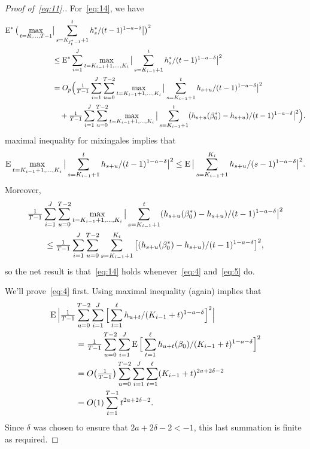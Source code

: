 \documentclass[12pt,fleqn]{article}
\begin{document}
\begin{proof}[Proof of~\eqref{eq:11}.]
For~\eqref{eq:14}, we have
\begin{align*}
  \operatorname{E}^* \big(\max_{t=R,\dots,T-1} &\big|\sum_{s=K_{j^*_t - 1}+1}^t h_s^*/(t-1)^{1-a-\delta} \big|\big)^2 \\
  &\leq \operatorname{E}^* \sum_{i=1}^{J} \max_{t = K_{i-1}+1,\dots,K_i} \big| \sum_{s=K_{i-1}+1}^t h_s^*/(t-1)^{1-a-\delta} \big|^2 \\
  &= O_p\Big(\tfrac{1}{T-1} \sum_{i=1}^{J} \sum_{u=0}^{T-2} \max_{t = K_{i-1}+1,\dots,K_i} \big| \sum_{s=K_{i-1}+1}^t h_{s+u} /(t-1)^{1-a-\delta} \big|^2 \\
  &\quad+ \tfrac{1}{T-1} \sum_{i=1}^{J} \sum_{u=0}^{T-2} \max_{t = K_{i-1}+1,\dots,K_i} \big| \sum_{s=K_{i-1}+1}^t (h_{s+u}(\beta_0^*) - h_{s+u}) /(t-1)^{1-a-\delta} \big|^2\Big).
\end{align*}
 maximal inequality for mixingales implies that
\begin{equation*}
  \operatorname{E} \max_{t = K_{i-1}+1,\dots,K_i} \big| \sum_{s=K_{i-1}+1}^t h_{s+u} /(t-1)^{1-a-\delta} \big|^2
  \leq \operatorname{E} \big| \sum_{s=K_{i-1}+1}^{K_i} h_{s+u} /(s-1)^{1-a-\delta} \big|^2.
\end{equation*}
Moreover,
\begin{multline*}
  \tfrac{1}{T-1} \sum_{i=1}^{J} \sum_{u=0}^{T-2} \max_{t = K_{i-1}+1,\dots,K_i} \big| \sum_{s=K_{i-1}+1}^t (h_{s+u}(\beta_0^*) - h_{s+u}) /(t-1)^{1-a-\delta} \big|^2 \\
  \leq \tfrac{1}{T-1} \sum_{i=1}^{J} \sum_{u=0}^{T-2} \sum_{s=K_{i-1}+1}^{K_i} \big[(h_{s+u}(\beta_0^*) - h_{s+u})/(t-1)^{1-a-\delta}\big]^2,
\end{multline*}
so the net result is that~\eqref{eq:14} holds whenever~\eqref{eq:4}
and~\eqref{eq:5} do.

We'll prove~\eqref{eq:4} first. Using  maximal
inequality (again) implies that
\begin{align*}
  \operatorname{E}\Big|\tfrac{1}{T-1}
  &\sum_{u = 0}^{T-2} \sum_{i=1}^J \Big[\sum_{t = 1}^{\ell} h_{u + t}/ (K_{i-1} + t)^{1-a-\delta}\Big]^2 \Big| \\
  &= \tfrac{1}{T-1} \sum_{u = 0}^{T-2} \sum_{i=1}^J \operatorname{E} \Big[\sum_{t = 1}^{\ell} h_{u + t}(\beta_0)/ (K_{i-1} + t)^{1-a-\delta} \Big]^2 \\
  &= O\big(\tfrac{1}{T-1}\big) \sum_{u = 0}^{T-2} \sum_{i=1}^J \sum_{t = 1}^{\ell} (K_{i-1} + t)^{2a + 2\delta-2} \\
  &= O(1) \sum_{t=1}^{T-1} t^{2a+2\delta-2}.
\end{align*}
Since $\delta$ was chosen to ensure that $2a+2\delta-2 < -1$, this
last summation is finite as required.


\end{proof}
\end{document}
